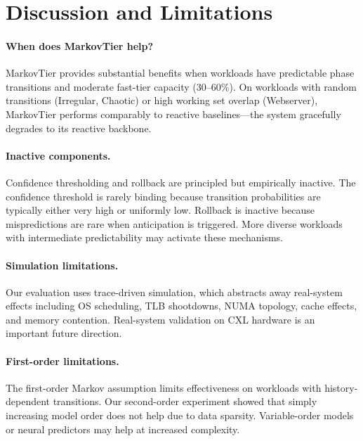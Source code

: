 \documentclass[preprint]{article}
\begin{document}
\section{Discussion and Limitations}
\label{sec:discussion}

\paragraph{When does MarkovTier help?}
MarkovTier provides substantial benefits when workloads have predictable phase transitions and moderate fast-tier capacity (30--60\%). On workloads with random transitions (Irregular, Chaotic) or high working set overlap (Webserver), MarkovTier performs comparably to reactive baselines---the system gracefully degrades to its reactive backbone.

\paragraph{Inactive components.}
Confidence thresholding and rollback are principled but empirically inactive. The confidence threshold is rarely binding because transition probabilities are typically either very high or uniformly low. Rollback is inactive because mispredictions are rare when anticipation is triggered. More diverse workloads with intermediate predictability may activate these mechanisms.

\paragraph{Simulation limitations.}
Our evaluation uses trace-driven simulation, which abstracts away real-system effects including OS scheduling, TLB shootdowns, NUMA topology, cache effects, and memory contention. Real-system validation on CXL hardware is an important future direction.

\paragraph{First-order limitations.}
The first-order Markov assumption limits effectiveness on workloads with history-dependent transitions. Our second-order experiment showed that simply increasing model order does not help due to data sparsity. Variable-order models or neural predictors may help at increased complexity.
\end{document}
